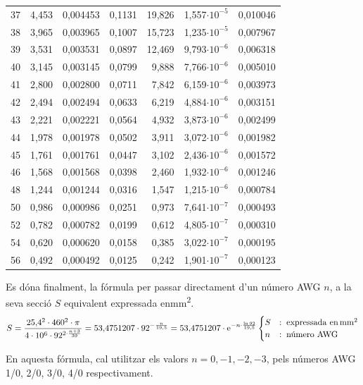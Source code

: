 \begin{longtable}{crrrrrr}
37 &      4,453 &   0,004453 &     0,1131 &     19,826 &  1,557$\cdot 10^{-5}$ &   0,010046 \\
38 &      3,965 &   0,003965 &     0,1007 &     15,723 &  1,235$\cdot 10^{-5}$ &   0,007967 \\
39 &      3,531 &   0,003531 &     0,0897 &     12,469 &  9,793$\cdot 10^{-6}$ &   0,006318 \\
40 &      3,145 &   0,003145 &     0,0799 &      9,888 &  7,766$\cdot 10^{-6}$ &   0,005010 \\
41 &      2,800 &   0,002800 &     0,0711 &      7,842 &  6,159$\cdot 10^{-6}$ &   0,003973 \\
42 &      2,494 &   0,002494 &     0,0633 &      6,219 &  4,884$\cdot 10^{-6}$ &   0,003151 \\
43 &      2,221 &   0,002221 &     0,0564 &      4,932 &  3,873$\cdot 10^{-6}$ &   0,002499 \\
44 &      1,978 &   0,001978 &     0,0502 &      3,911 &  3,072$\cdot 10^{-6}$ &   0,001982 \\
45 &      1,761 &   0,001761 &     0,0447 &      3,102 &  2,436$\cdot 10^{-6}$ &   0,001572 \\
46 &      1,568 &   0,001568 &     0,0398 &      2,460 &  1,932$\cdot 10^{-6}$ &   0,001246 \\
48 &      1,244 &   0,001244 &     0,0316 &      1,547 &  1,215$\cdot 10^{-6}$ &   0,000784 \\
50 &      0,986 &   0,000986 &     0,0251 &      0,973 &  7,641$\cdot 10^{-7}$ &   0,000493 \\
52 &      0,782 &   0,000782 &     0,0199 &      0,612 &  4,805$\cdot 10^{-7}$ &   0,000310
\\
54 &      0,620 &   0,000620 &     0,0158 &      0,385 &  3,022$\cdot 10^{-7}$ &   0,000195
\\
56 &      0,492 &   0,000492 &     0,0125 &      0,242 &  1,901$\cdot 10^{-7}$ &   0,000123
\\
\bottomrule[1pt]
\end{longtable}

 Es d\'{o}na finalment, la f\'{o}rmula per passar directament d'un n\'{u}mero AWG $n$, a la seva secci\'{o} $S$ equivalent expressada en\unit{mm^2}.
\begin{equation}
   S = \frac{25{,}4^2 \cdot 460^2 \cdot \pi}{4 \cdot 10^6 \cdot 92^{2\cdot\frac{n+3}{39}}} =
   53{,}4751207 \cdot 92^{-\frac{n}{19{,}5}} = 53{,}4751207 \cdot \mathrm{e}^{-n\cdot \frac{\ln 92}{19{,}5} }\label{eq:awg_mm2}
\begin{cases}
   S &:\; \text{expressada en\ensuremath{\mathrm{\,mm^2}}} \\
   n &:\; \text{n\'{u}mero AWG}
\end{cases}
\end{equation}

En aquesta f\'{o}rmula, cal utilitzar els valors $n = 0, -1, -2, -3$,  pels n\'{u}meros AWG 1/0,
2/0, 3/0, 4/0 respectivament.
